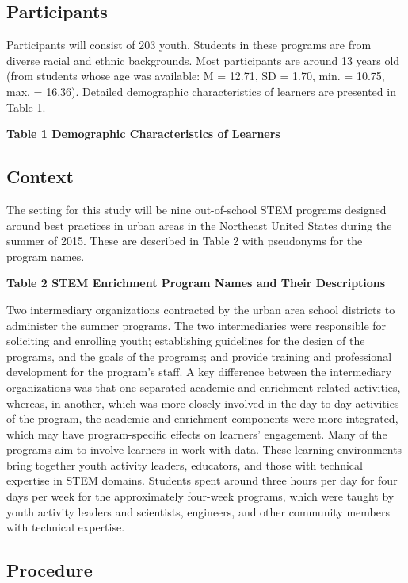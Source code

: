 \documentclass[]{msu-thesis}
\theoremstyle{definition}
\theoremstyle{definition}
\theoremstyle{definition}
\theoremstyle{remark}
\begin{document}
\subsection{Participants}\label{participants}

Participants will consist of 203 youth. Students in these programs are
from diverse racial and ethnic backgrounds. Most participants are around
13 years old (from students whose age was available: M = 12.71, SD =
1.70, min. = 10.75, max. = 16.36). Detailed demographic characteristics
of learners are presented in Table 1.

\textbf{Table 1 Demographic Characteristics of Learners}

\subsection{Context}\label{context}

The setting for this study will be nine out-of-school STEM programs
designed around best practices in urban areas in the Northeast United
States during the summer of 2015. These are described in Table 2 with
pseudonyms for the program names.

\textbf{Table 2 STEM Enrichment Program Names and Their Descriptions}

Two intermediary organizations contracted by the urban area school
districts to administer the summer programs. The two intermediaries were
responsible for soliciting and enrolling youth; establishing guidelines
for the design of the programs, and the goals of the programs; and
provide training and professional development for the program's staff. A
key difference between the intermediary organizations was that one
separated academic and enrichment-related activities, whereas, in
another, which was more closely involved in the day-to-day activities of
the program, the academic and enrichment components were more
integrated, which may have program-specific effects on learners'
engagement. Many of the programs aim to involve learners in work with
data. These learning environments bring together youth activity leaders,
educators, and those with technical expertise in STEM domains. Students
spent around three hours per day for four days per week for the
approximately four-week programs, which were taught by youth activity
leaders and scientists, engineers, and other community members with
technical expertise.

\subsection{Procedure}\label{procedure}
\end{document}

